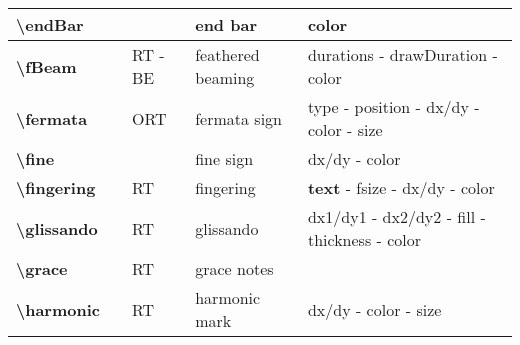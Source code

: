 \documentclass[a4paper, landscape, 10pt]{article}
\begin{document}
\begin{tabularx}{\linewidth}{p{3cm}p{4.5cm}p{3cm}p{5.5cm}l}
    \textbf{\textbackslash{}endBar}&&&end bar&color\\
    \hline
    \textbf{\textbackslash{}fBeam}&&RT - BE&feathered beaming&durations - drawDuration - color\\
    \hline
    \textbf{\textbackslash{}fermata}&&ORT&fermata sign&type - position - dx/dy - color - size\\
    \hline
    \textbf{\textbackslash{}fine}&&&fine sign&dx/dy - color\\
    \hline
    \textbf{\textbackslash{}fingering}&&RT&fingering&\textbf{text} - fsize - dx/dy - color\\
    \hline
    \textbf{\textbackslash{}glissando}&&RT&glissando&dx1/dy1 - dx2/dy2 - fill - thickness - color\\
    \hline
    \textbf{\textbackslash{}grace}&&RT&grace notes&\\
    \hline
    \textbf{\textbackslash{}harmonic}&&RT&harmonic mark&dx/dy - color - size\\
    \hline
\end{tabularx}
%
%
\end{document}
